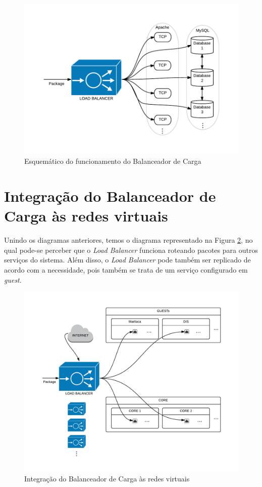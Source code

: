     \begin{figure}[htb]
    \centering
    \includegraphics[scale=0.82]{imagens/esquema3.pdf}
    \caption{Esquemático do funcionamento do Balanceador de Carga}
    \label{fig:balanceador}
    \end{figure}    
    
    
\section{Integração do Balanceador de Carga às redes virtuais}
    Unindo os diagramas anteriores, temos o diagrama representado na Figura \ref{fig:integracaoloadbalan}, no qual pode-se perceber que o \textit{Load Balancer} funciona roteando pacotes para outros serviços do sistema. Além disso, o \textit{Load Balancer} pode também ser replicado de acordo com a necessidade, pois também se trata de um serviço configurado em \textit{guest}.
    
    \begin{figure}[htb]
    \centering
    \includegraphics[scale=0.50]{imagens/esquema4.pdf}
    \caption{Integração do Balanceador de Carga às redes virtuais}
    \label{fig:integracaoloadbalan}
    \end{figure}


